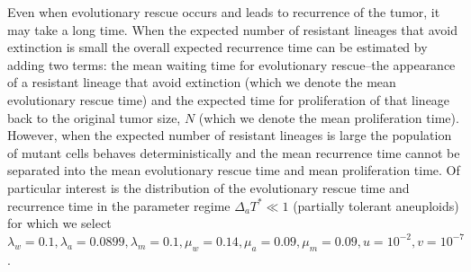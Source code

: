 \documentclass[12pt]{extarticle}
\begin{document}
Even when evolutionary rescue occurs and leads to recurrence of the tumor, it may take a long time.
When the expected number of resistant lineages that avoid extinction is small the overall expected recurrence time can be estimated by adding two terms: the mean waiting time for evolutionary rescue--the appearance of a resistant lineage that avoid extinction (which we denote the mean evolutionary rescue time) and the expected time for proliferation of that lineage back to the original tumor size, $N$ (which we denote the mean proliferation time). However, when the expected number of resistant lineages is large the population of mutant cells behaves deterministically and the mean recurrence time cannot be separated into the mean evolutionary rescue time and mean proliferation time. Of particular interest is the distribution of the evolutionary rescue time and recurrence time in the parameter regime  $\Delta_a T^*\ll1$ (partially tolerant aneuploids) for which we select  $\lambda_w=0.1, \lambda_a=0.0899,\lambda_m=0.1,\mu_w=0.14,\mu_a=0.09,\mu_m=0.09, u=10^{-2}, v=10^{-7}$ .
\end{document}
